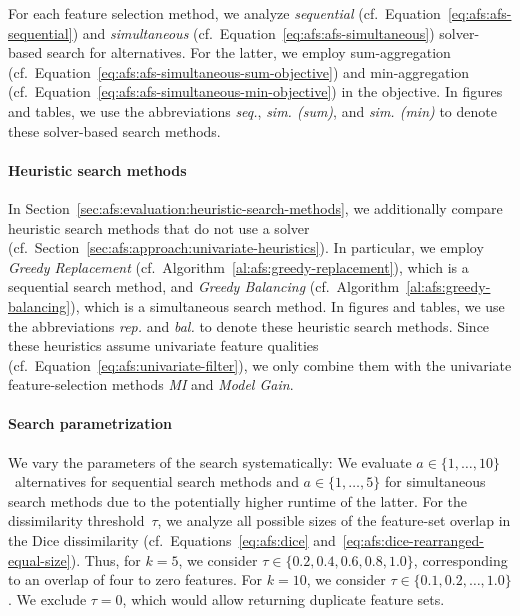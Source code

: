 \documentclass{article}
\theoremstyle{definition}
\begin{document}
For each feature selection method, we analyze \emph{sequential} (cf.~Equation~\ref{eq:afs:afs-sequential}) and \emph{simultaneous} (cf.~Equation~\ref{eq:afs:afs-simultaneous}) solver-based search for alternatives.
For the latter, we employ sum-aggregation (cf.~Equation~\ref{eq:afs:afs-simultaneous-sum-objective}) and min-aggregation (cf.~Equation~\ref{eq:afs:afs-simultaneous-min-objective}) in the objective.
In figures and tables, we use the abbreviations \emph{seq.}, \emph{sim. (sum)}, and \emph{sim. (min)} to denote these solver-based search methods.

\paragraph{Heuristic search methods}

In Section~\ref{sec:afs:evaluation:heuristic-search-methods}, we additionally compare heuristic search methods that do not use a solver (cf.~Section~\ref{sec:afs:approach:univariate-heuristics}).
In particular, we employ \emph{Greedy Replacement} (cf.~Algorithm~\ref{al:afs:greedy-replacement}), which is a sequential search method, and \emph{Greedy Balancing} (cf.~Algorithm~\ref{al:afs:greedy-balancing}), which is a simultaneous search method.
In figures and tables, we use the abbreviations \emph{rep.} and \emph{bal.} to denote these heuristic search methods.
Since these heuristics assume univariate feature qualities (cf.~Equation~\ref{eq:afs:univariate-filter}), we only combine them with the univariate feature-selection methods \emph{MI} and \emph{Model Gain}.

\paragraph{Search parametrization}

We vary the parameters of the search systematically:
We evaluate $a \in \{1, \dots, 10\}$~alternatives for sequential search methods and $a \in \{1, \dots, 5\}$ for simultaneous search methods due to the potentially higher runtime of the latter.
For the dissimilarity threshold~$\tau$, we analyze all possible sizes of the feature-set overlap in the Dice dissimilarity (cf.~Equations~\ref{eq:afs:dice} and~\ref{eq:afs:dice-rearranged-equal-size}).
Thus, for $k=5$, we consider $\tau \in \{0.2, 0.4, 0.6, 0.8, 1.0\}$, corresponding to an overlap of four to zero features.
For $k=10$, we consider $\tau \in \{0.1, 0.2, \dots, 1.0\}$.
We exclude $\tau = 0$, which would allow returning duplicate feature sets.
\end{document}
